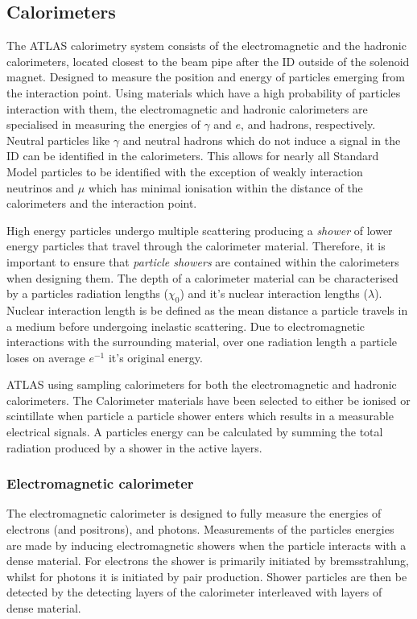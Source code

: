 \subsection{Calorimeters}\label{sec:method:Cals}
The ATLAS calorimetry system consists of the electromagnetic and the hadronic calorimeters, located closest to the beam pipe after the ID outside of the solenoid magnet. Designed to measure the position and energy of particles emerging from the interaction point. Using materials which have a high probability of particles interaction with them, the electromagnetic and hadronic calorimeters are specialised in measuring the energies of $\gamma$ and $e$, and hadrons, respectively. Neutral particles like $\gamma$ and neutral hadrons which do not induce a signal in the ID can be identified in the calorimeters. This allows for nearly all Standard Model particles to be identified with the exception of weakly interaction neutrinos and $\mu$ which has minimal ionisation within the distance of the calorimeters and the interaction point. 

High energy particles undergo multiple scattering producing a \emph{shower} of lower energy particles that travel through the calorimeter material. Therefore, it is important to ensure that  \emph{particle showers} are contained within the calorimeters when designing them. The depth of a calorimeter material can be characterised by a particles radiation lengths ($\chi_{0}$) and it's nuclear interaction lengths ($\lambda$). Nuclear interaction length is be defined as the mean distance a particle travels in a medium before undergoing inelastic scattering. Due to electromagnetic interactions with the surrounding material, over one radiation length a particle loses on average $e^{-1}$ it's original energy. 

ATLAS using sampling calorimeters for both the electromagnetic and hadronic calorimeters. The Calorimeter materials have been selected to either be ionised or scintillate when particle a particle shower enters which results in a measurable electrical signals. A particles energy can be calculated by summing the total radiation produced by a shower in the active layers. 

\subsubsection{Electromagnetic calorimeter}
The electromagnetic calorimeter is designed to fully measure the energies of electrons (and positrons), and photons. Measurements of the particles energies are made by inducing electromagnetic showers when the particle interacts with a dense material. For electrons the shower is primarily initiated by bremsstrahlung, whilst for photons it is initiated by pair production. Shower particles are then be detected by the detecting layers of the calorimeter interleaved with layers of dense material.

